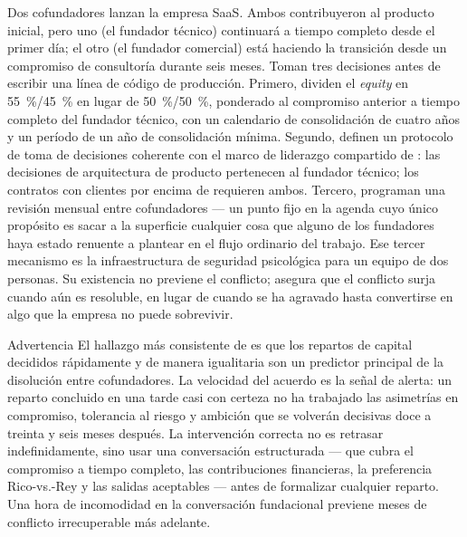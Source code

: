 \begin{example}
Dos cofundadores lanzan la empresa SaaS. Ambos contribuyeron al producto inicial, pero uno
(el fundador técnico) continuará a tiempo completo desde el primer día; el otro (el fundador
comercial) está haciendo la transición desde un compromiso de consultoría durante seis meses.
Toman tres decisiones antes de escribir una línea de código de producción. Primero, dividen el
\emph{equity} en \qty{55}{\percent}/\qty{45}{\percent} en lugar de
\qty{50}{\percent}/\qty{50}{\percent}, ponderado al compromiso anterior a tiempo completo del
fundador técnico, con un calendario de consolidación de cuatro años y un período de un año de
consolidación mínima. Segundo, definen un protocolo de toma de decisiones coherente con el marco
de liderazgo compartido de \textcite{ensley2006shared}: las decisiones de arquitectura de
producto pertenecen al fundador técnico; los contratos con clientes por encima de 
requieren ambos. Tercero, programan una revisión mensual entre cofundadores --- un punto fijo en
la agenda cuyo único propósito es sacar a la superficie cualquier cosa que alguno de los
fundadores haya estado renuente a plantear en el flujo ordinario del trabajo. Ese tercer
mecanismo es la infraestructura de seguridad psicológica para un equipo de dos personas. Su
existencia no previene el conflicto; asegura que el conflicto surja cuando aún es resoluble, en
lugar de cuando se ha agravado hasta convertirse en algo que la empresa no puede sobrevivir.
\end{example}

\begin{admonition}{Advertencia}
El hallazgo más consistente de \textcite{wasserman2012founders} es que los repartos de capital
decididos rápidamente y de manera igualitaria son un predictor principal de la disolución entre
cofundadores. La velocidad del acuerdo es la señal de alerta: un reparto concluido en una tarde
casi con certeza no ha trabajado las asimetrías en compromiso, tolerancia al riesgo y ambición
que se volverán decisivas doce a treinta y seis meses después. La intervención correcta no es
retrasar indefinidamente, sino usar una conversación estructurada --- que cubra el compromiso a
tiempo completo, las contribuciones financieras, la preferencia Rico-vs.-Rey y las salidas
aceptables --- antes de formalizar cualquier reparto. Una hora de incomodidad en la conversación
fundacional previene meses de conflicto irrecuperable más adelante.
\end{admonition}

